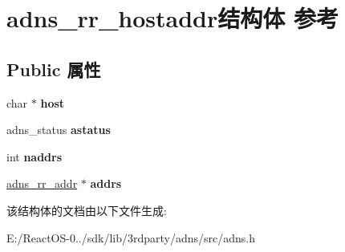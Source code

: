 \hypertarget{structadns__rr__hostaddr}{}\section{adns\+\_\+rr\+\_\+hostaddr结构体 参考}
\label{structadns__rr__hostaddr}
\subsection*{Public 属性}
\begin{DoxyCompactItemize}
\item 
\mbox{\label{structadns__rr__hostaddr_a704f0c1cad4b8f251d7bf9bd78228a8b}} 
char $\ast$ {\bfseries host}
\item 
\mbox{\label{structadns__rr__hostaddr_ac7eb93f089ede05892478145ca33cab3}} 
adns\+\_\+status {\bfseries astatus}
\item 
\mbox{\label{structadns__rr__hostaddr_a73759430c9e102cf4b828caeaeed0ae4}} 
int {\bfseries naddrs}
\item 
\mbox{\label{structadns__rr__hostaddr_a6e7cee1783d06725b711fde9b3366cf9}} 
\hyperlink{structadns__rr__addr}{adns\+\_\+rr\+\_\+addr} $\ast$ {\bfseries addrs}
\end{DoxyCompactItemize}


该结构体的文档由以下文件生成\+:\begin{DoxyCompactItemize}
\item 
E\+:/\+React\+O\+S-\/0../sdk/lib/3rdparty/adns/src/adns.\+h\end{DoxyCompactItemize}
